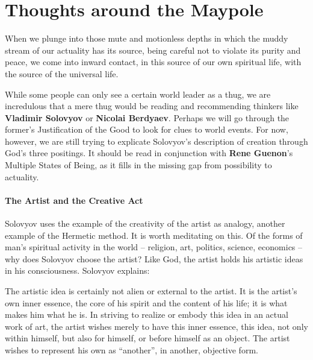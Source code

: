\section{Thoughts around the Maypole}

\begin{quotex}
When we plunge into those mute and motionless depths in which the muddy stream of our actuality has its source, being careful not to violate its purity and peace, we come into inward contact, in this source of our own spiritual life, with the source of the universal life.
\end{quotex}


While some people can only see a certain world leader as a thug, we are incredulous that a mere thug would be reading and recommending thinkers like \textbf{Vladimir Solovyov} or \textbf{Nicolai Berdyaev}. Perhaps we will go through the former's Justification of the Good to look for clues to world events. For now, however, we are still trying to explicate Solovyov's description of creation through God's three positings. It should be read in conjunction with \textbf{Rene Guenon}'s Multiple States of Being, as it fills in the missing gap from possibility to actuality.

\paragraph{The Artist and the Creative Act}


Solovyov uses the example of the creativity of the artist as analogy, another example of the Hermetic method. It is worth meditating on this. Of the forms of man's spiritual activity in the world -- religion, art, politics, science, economics -- why does Solovyov choose the artist? Like God, the artist holds his artistic ideas in his consciousness. Solovyov explains:

\begin{quotex}
The artistic idea is certainly not alien or external to the artist. It is the artist's own inner essence, the core of his spirit and the content of his life; it is what makes him what he is. In striving to realize or embody this idea in an actual work of art, the artist wishes merely to have this inner essence, this idea, not only within himself, but also for himself, or before himself as an object. The artist wishes to represent his own as ``another'', in another, objective form.
\end{quotex}


